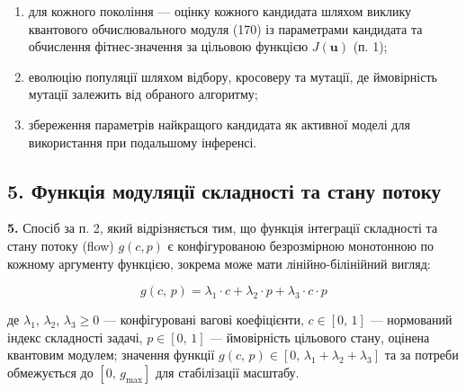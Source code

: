 \documentclass[12pt,a4paper]{article}
\begin{document}
\begin{enumerate}

\def\labelenumi{(\roman{enumi})}

\setcounter{enumi}{1}

\item

  для кожного покоління --- оцінку кожного кандидата шляхом виклику квантового обчислювального модуля (170) із параметрами кандидата та обчислення фітнес-значення за цільовою функцією \(J(\mathbf{u})\) (п. 1);

\item

  еволюцію популяції шляхом відбору, кросоверу та мутації, де ймовірність мутації залежить від обраного алгоритму;

\item

  збереження параметрів найкращого кандидата як активної моделі для використання при подальшому інференсі.

\end{enumerate}



\subsection{5. Функція модуляції складності та стану потоку}\label{ux444ux443ux43dux43aux446ux456ux44f-ux43cux43eux434ux443ux43bux44fux446ux456ux457-ux441ux43aux43bux430ux434ux43dux43eux441ux442ux456-ux442ux430-ux441ux442ux430ux43dux443-ux43fux43eux442ux43eux43aux443}



\textbf{5.} Спосіб за п. 2, який відрізняється тим, що функція інтеграції складності та стану потоку (flow) \(g(c, p)\) є конфігурованою безрозмірною монотонною по кожному аргументу функцією, зокрема може мати лінійно-білінійний вигляд:



\[g(c,\,p) = \lambda_1 \cdot c + \lambda_2 \cdot p + \lambda_3 \cdot c \cdot p\]



де \(\lambda_1\), \(\lambda_2\), \(\lambda_3 \geq 0\) --- конфігуровані вагові коефіцієнти, \(c \in [0,\,1]\) --- нормований індекс складності задачі, \(p \in [0,\,1]\) --- ймовірність цільового стану, оцінена квантовим модулем; значення функції \(g(c,\,p) \in [0,\,\lambda_1 + \lambda_2 + \lambda_3]\) та за потреби обмежується до \([0,\,g_{\max}]\) для стабілізації масштабу.
\end{document}
